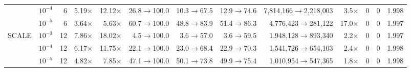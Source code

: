 \begin{tabular}{@{}llrrrrrrrrrrr@{}}
 & $10^{-4}$ & 6 & 5.19$\times$ & 12.12$\times$ & 26.8$\to$100.0 & 10.3$\to$67.5 & 12.9$\to$74.6 & 7{,}814{,}166$\to$2{,}218{,}003 & 3.5$\times$ & 0 & 0 & 1.998 \\
 & $10^{-5}$ & 6 & 3.64$\times$ & 5.63$\times$ & 60.7$\to$100.0 & 48.8$\to$83.9 & 51.4$\to$86.3 & 4{,}776{,}423$\to$281{,}122 & 17.0$\times$ & 0 & 0 & 1.997 \\
\midrule
SCALE & $10^{-3}$ & 12 & 7.86$\times$ & 18.02$\times$ & 4.5$\to$100.0 & 3.6$\to$57.0 & 3.6$\to$59.5 & 1{,}948{,}128$\to$893{,}340 & 2.2$\times$ & 0 & 0 & 1.997 \\
 & $10^{-4}$ & 12 & 6.17$\times$ & 11.75$\times$ & 22.1$\to$100.0 & 23.0$\to$68.4 & 22.9$\to$70.3 & 1{,}541{,}726$\to$654{,}103 & 2.4$\times$ & 0 & 0 & 1.998 \\
 & $10^{-5}$ & 12 & 4.82$\times$ & 7.85$\times$ & 47.1$\to$100.0 & 50.1$\to$73.8 & 49.9$\to$75.4 & 1{,}010{,}954$\to$547{,}365 & 1.8$\times$ & 0 & 0 & 1.998 \\
\bottomrule
\end{tabular}
